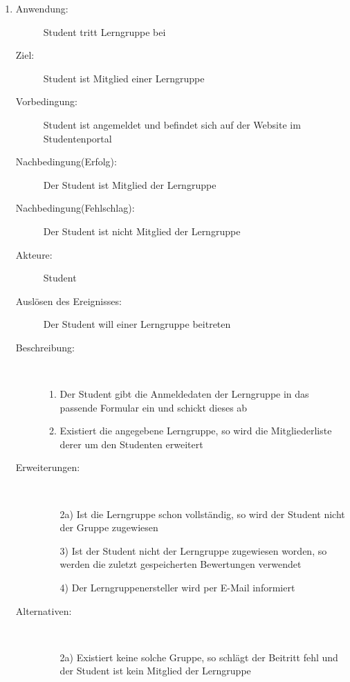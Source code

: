 \documentclass[parskip=full]{scrartcl}
\newcommand{\swtLabel}[1]{\textbf{\textbackslash #1\arabic*0\textbackslash}}
\begin{document}
\begin{enumerate}[label=\swtLabel{S}]
  
  \item
  \begin{description}
  \item[Anwendung:] Student tritt Lerngruppe bei
  \item[Ziel:] Student ist Mitglied einer Lerngruppe
  	\item[Vorbedingung:] Student ist angemeldet und befindet sich auf der Website im Studentenportal
  	\item[Nachbedingung(Erfolg):] Der Student ist Mitglied der Lerngruppe
  	\item[Nachbedingung(Fehlschlag):] Der Student ist nicht Mitglied der
  	Lerngruppe
  	\item[Akteure:] Student
  	\item[Auslösen des Ereignisses:] Der Student will einer Lerngruppe beitreten
  	\item[Beschreibung:]~
  	\begin{enumerate}
  	  \item Der Student gibt die Anmeldedaten der Lerngruppe in das passende
  	  Formular ein und schickt dieses ab
  	  \item Existiert die angegebene Lerngruppe, so wird die Mitgliederliste
  	  derer um den Studenten erweitert
  	\end{enumerate}
  	\item[Erweiterungen:]~
  	\begin{enumerate}
  	  \item[2a)] Ist die Lerngruppe schon vollständig, so wird der Student nicht
  	  der Gruppe zugewiesen
  	  \item[3)] Ist der Student nicht der Lerngruppe zugewiesen worden, so werden
  	  die zuletzt gespeicherten Bewertungen verwendet
  	  \item[4)] Der Lerngruppenersteller wird per E-Mail informiert
  	 \end{enumerate}
  	\item[Alternativen:] ~
  	\begin{enumerate}
  	  \item[2a)] Existiert keine solche Gruppe, so schlägt der Beitritt fehl und
  	  der Student ist kein Mitglied der Lerngruppe
  	 \end{enumerate}  
  \end{description}
%   
  

\end{enumerate}
\end{document}
